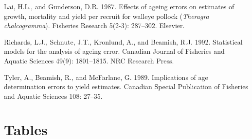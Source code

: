 \documentclass[11pt]{book}
\begin{document}
\leavevmode\hypertarget{ref-lai1987effects}{}%
Lai, H.L., and Gunderson, D.R. 1987. Effects of ageing errors on estimates of growth, mortality and yield per recruit for walleye pollock (\emph{Theragra chalcogramma}). Fisheries Research 5(2-3): 287--302. Elsevier.

\leavevmode\hypertarget{ref-richards1992statistical}{}%
Richards, L.J., Schnute, J.T., Kronlund, A., and Beamish, R.J. 1992. Statistical models for the analysis of ageing error. Canadian Journal of Fisheries and Aquatic Sciences 49(9): 1801--1815. NRC Research Press.

\leavevmode\hypertarget{ref-tyler1989implications}{}%
Tyler, A., Beamish, R., and McFarlane, G. 1989. Implications of age determination errors to yield estimates. Canadian Special Publication of Fisheries and Aquatic Sciences 108: 27--35.

\newpage
\setcounter{table}{0}

\hypertarget{tables}{%
\section{Tables}\label{tables}}

\newpage
\end{document}
